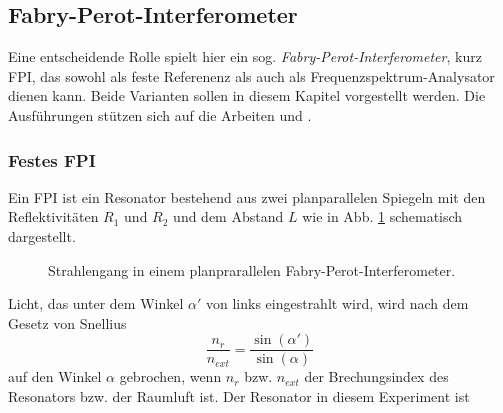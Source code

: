 \subsection{Fabry-Perot-Interferometer}
Eine entscheidende Rolle spielt hier ein sog.
\textit{Fabry-Perot-Interferometer}, kurz FPI, das sowohl
als feste Referenenz als auch als Frequenzspektrum-Analysator dienen kann.
Beide Varianten sollen in diesem Kapitel vorgestellt werden. Die Ausführungen
stützen sich auf die Arbeiten \cite{wiche:1997:diplomarbeit} und
\cite{kuschnick:2000:diplomarbeit}.

\subsubsection{Festes FPI}\label{subsubsec:festes_FPI}
Ein FPI ist ein Resonator bestehend aus zwei planparallelen Spiegeln mit den
Reflektivitäten $R_1$ und $R_2$ und dem Abstand $L$ wie in Abb.
\ref{fig:FPI_planparallel} schematisch dargestellt.
\begin{figure}[h]
 	\centering
	\caption[FPI - planparallel]{Strahlengang in einem
	planprarallelen Fabry-Perot-Interferometer.}\label{fig:FPI_planparallel}
\end{figure}
Licht, das unter dem Winkel
$\alpha'$ von links eingestrahlt wird, wird nach dem Gesetz von Snellius
\begin{equation}\label{eq:snellius}
	\frac{n_r}{n_{ext}}=\frac{\sin{(\alpha')}}{\sin{(\alpha)}}
\end{equation}
auf den Winkel $\alpha$ gebrochen, wenn $n_r$ bzw. $n_{ext}$ der Brechungsindex
des Resonators bzw. der Raumluft ist. Der Resonator in diesem Experiment ist
